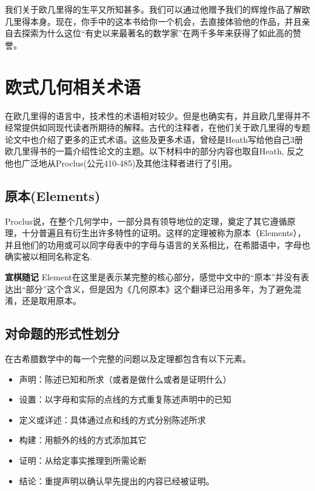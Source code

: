 \documentclass[
]{book}
\begin{document}
我们关于欧几里得的生平又所知甚多。我们可以通过他赠予我们的辉煌作品了解欧几里得本身。现在，你手中的这本书给你一个机会，去直接体验他的作品，并且亲自去探索为什么这位``有史以来最著名的数学家''在两千多年来获得了如此高的赞誉。

\hypertarget{ux6b27ux5f0fux51e0ux4f55ux76f8ux5173ux672fux8bed}{%
\chapter*{欧式几何相关术语}\label{ux6b27ux5f0fux51e0ux4f55ux76f8ux5173ux672fux8bed}}

在欧几里得的语言中，技术性的术语相对较少。但是也确实有，并且欧几里得并不经常提供如同现代读者所期待的解释。古代的注释者，在他们关于欧几里得的专题论文中也介绍了更多的正式术语。这些及更多术语，曾经是Heath写给他自己3册欧几里得书的一篇介绍性论文的主题。以下材料中的部分内容也取自Heath, 反之他也广泛地从Proclus(公元410-485)及其他注释者进行了引用。

\hypertarget{ux539fux672celements}{%
\section*{原本(Elements)}\label{ux539fux672celements}}

Proclus说，在整个几何学中，一部分具有领导地位的定理，奠定了其它遵循原理，十分普遍且有衍生出许多特性的证明。这样的定理被称为原本（Elements），并且他们的功用或可以同字母表中的字母与语言的关系相比，在希腊语中，字母也确实被以相同名称定名.

\textbf{宣棋随记}
Element在这里是表示某完整的核心部分，感觉中文中的``原本''并没有表达出``部分''这个含义，但是因为《几何原本》这个翻译已沿用多年，为了避免混淆，还是取用原本。

\hypertarget{ux5bf9ux547dux9898ux7684ux5f62ux5f0fux6027ux5212ux5206}{%
\section*{对命题的形式性划分}\label{ux5bf9ux547dux9898ux7684ux5f62ux5f0fux6027ux5212ux5206}}

在古希腊数学中的每一个完整的问题以及定理都包含有以下元素。

\begin{itemize}
\item
  声明：陈述已知和所求（或者是做什么或者是证明什么）
\item
  设置：以字母和实际的点线的方式重复陈述声明中的已知
\item
  定义或详述：具体通过点和线的方式分别陈述所求
\item
  构建：用额外的线的方式添加其它
\item
  证明：从给定事实推理到所需论断
\item
  结论：重提声明以确认早先提出的内容已经被证明。
\end{itemize}
\end{document}
